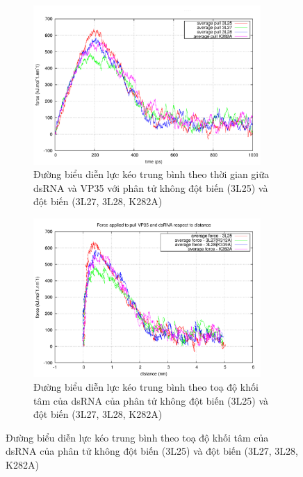 \documentclass[12pt,a4paper,reqno, oneside]{book}
\begin{document}
	\begin{figure}[t!]
	\centering
	\begin{subfigure}{0.95\textwidth}
	\includegraphics[width=0.95\textwidth,natwidth=610,natheight=642]{pullf}
	\caption{Đường biểu diễn lực kéo trung bình theo thời gian giữa dsRNA và VP35 với phân tử không đột biến (3L25) và đột biến (3L27, 3L28, \gls{K282A})}
	\label{pullft}
	\end{subfigure}
	\begin{subfigure}{0.95\textwidth}
	\centering
	\includegraphics[width=0.95\textwidth,natwidth=610,natheight=642]{pullfx}
	\caption{Đường biểu diễn lực kéo trung bình theo toạ độ khối tâm của dsRNA của phân tử không đột biến (3L25) và đột biến (3L27, 3L28, \gls{K282A})}
	\label{pullfx}
	\end{subfigure}
	\label{}
	\end{figure}
\end{document}
